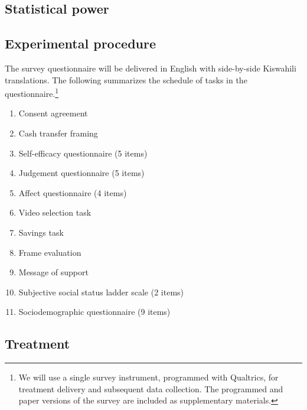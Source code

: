\documentclass[11pt, a4paper]{article}\usepackage[]{graphicx}\usepackage[]{color}
\begin{document}
    \subsection{Statistical power}


    \subsection{Experimental procedure}

        The survey questionnaire will be delivered in English with side-by-side Kiswahili translations. The following summarizes the schedule of tasks in the questionnaire.\footnote{We will use a single survey instrument, programmed with Qualtrics, for treatment delivery and subsequent data collection. The programmed and paper versions of the survey are included as supplementary materials.}

        \begin{enumerate}
            \item Consent agreement
            \item Cash transfer framing
            \item Self-efficacy questionnaire (5 items)
            \item Judgement questionnaire (5 items)
            \item Affect questionnaire (4 items)
            \item Video selection task
            \item Savings task
            \item Frame evaluation
            \item Message of support
            \item Subjective social status ladder scale (2 items)
            \item Sociodemographic questionnaire (9 items)
        \end{enumerate}

    \subsection{Treatment}
\end{document}
